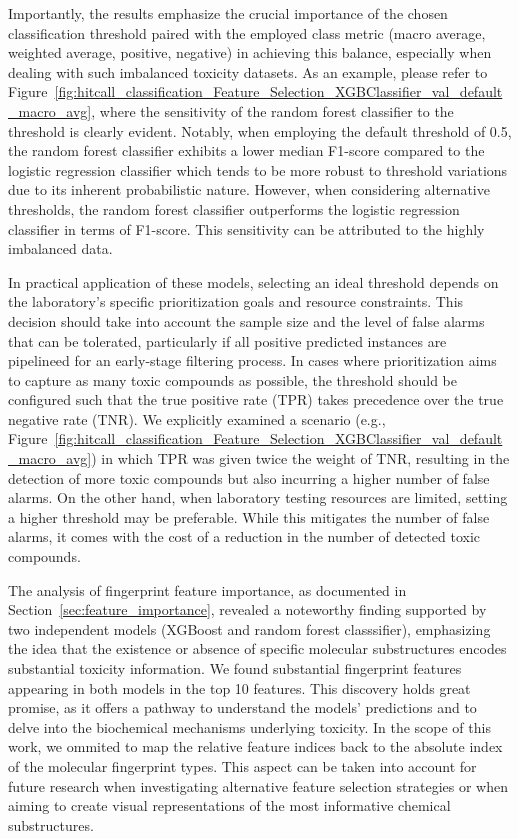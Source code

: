 Importantly, the results emphasize the crucial importance of the chosen classification threshold paired with the employed class metric (macro average, weighted average, positive, negative) in achieving this balance, especially when dealing with such imbalanced toxicity datasets. As an example, please refer to Figure~\ref{fig:hitcall_classification_Feature_Selection_XGBClassifier_val_default_macro_avg}, where the sensitivity of the random forest classifier to the threshold is clearly evident. Notably, when employing the default threshold of 0.5, the random forest classifier exhibits a lower median F1-score compared to the logistic regression classifier which tends to be more robust to threshold variations due to its inherent probabilistic nature. However, when considering alternative thresholds, the random forest classifier outperforms the logistic regression classifier in terms of F1-score. This sensitivity can be attributed to the highly imbalanced data. 

In practical application of these models, selecting an ideal threshold depends on the laboratory's specific prioritization goals and resource constraints. This decision should take into account the sample size and the level of false alarms that can be tolerated, particularly if all positive predicted instances are pipelineed for an early-stage filtering process. In cases where prioritization aims to capture as many toxic compounds as possible, the threshold should be configured such that the true positive rate (TPR) takes precedence over the true negative rate (TNR). We explicitly examined a scenario (e.g., Figure~\ref{fig:hitcall_classification_Feature_Selection_XGBClassifier_val_default_macro_avg}) in which TPR was given twice the weight of TNR, resulting in the detection of more toxic compounds but also incurring a higher number of false alarms. On the other hand, when laboratory testing resources are limited, setting a higher threshold may be preferable. While this mitigates the number of false alarms, it comes with the cost of a reduction in the number of detected toxic compounds.

The analysis of fingerprint feature importance, as documented in Section~\ref{sec:feature_importance}, revealed a noteworthy finding supported by two independent models (XGBoost and random forest classsifier), emphasizing the idea that the existence or absence of specific molecular substructures encodes substantial toxicity information. We found substantial fingerprint features appearing in both models in the top 10 features. This discovery holds great promise, as it offers a pathway to understand the models' predictions and to delve into the biochemical mechanisms underlying toxicity. In the scope of this work, we ommited to map the relative feature indices back to the absolute index of the molecular fingerprint types. This aspect can be taken into account for future research when investigating alternative feature selection strategies or when aiming to create visual representations of the most informative chemical substructures. 





